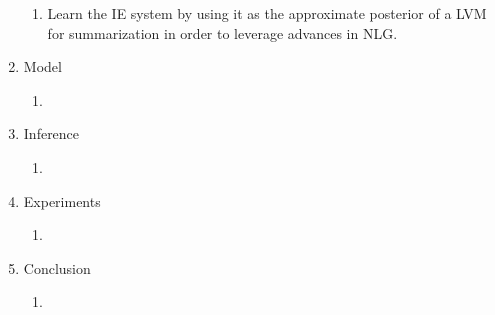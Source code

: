 \documentclass[11pt]{article}
\begin{document}
\begin{enumerate}
\begin{enumerate}
    \item Learn the IE system by using it as the approximate posterior
        of a LVM for summarization in order to leverage advances in NLG.
    \end{enumerate}
\item Model
    \begin{enumerate}
    \item 
    \end{enumerate}
\item Inference
    \begin{enumerate}
    \item 
    \end{enumerate}
\item Experiments
    \begin{enumerate}
    \item 
    \end{enumerate}
\item Conclusion
    \begin{enumerate}
    \item 
    \end{enumerate}
\end{enumerate}



\end{document}
